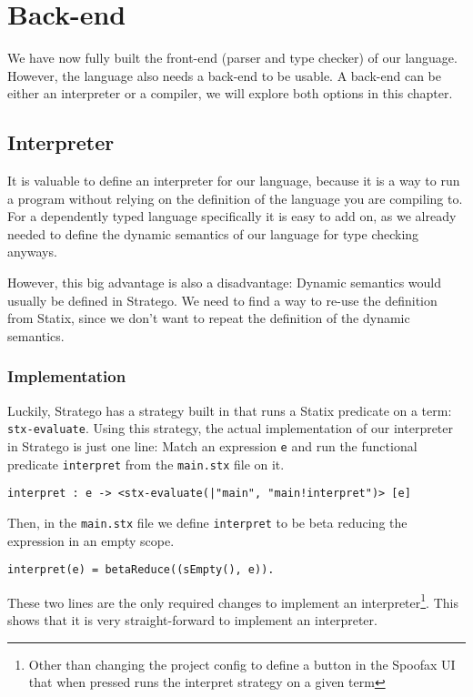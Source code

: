 \chapter{Back-end}
\label{ch:backend}

We have now fully built the front-end (parser and type checker) of our language. However, the language also needs a back-end to be usable. A back-end can be either an interpreter or a compiler, we will explore both options in this chapter.

\section{Interpreter}
It is valuable to define an interpreter for our language, because it is a way to run a program without relying on the definition of the language you are compiling to. For a dependently typed language specifically it is easy to add on, as we already needed to define the dynamic semantics of our language for type checking anyways. 

However, this big advantage is also a disadvantage: Dynamic semantics would usually be defined in Stratego. We need to find a way to re-use the definition from Statix, since we don't want to repeat the definition of the dynamic semantics.

\subsection{Implementation}

Luckily, Stratego has a strategy built in that runs a Statix predicate on a term: \verb|stx-evaluate|. Using this strategy, the actual implementation of our interpreter in Stratego is just one line: Match an expression \verb|e| and run the functional predicate \verb|interpret| from the \verb|main.stx| file on it.

\begin{lstlisting}
interpret : e -> <stx-evaluate(|"main", "main!interpret")> [e]
\end{lstlisting}

Then, in the \verb|main.stx| file we define \verb|interpret| to be beta reducing the expression in an empty scope. 

\begin{lstlisting}
interpret(e) = betaReduce((sEmpty(), e)).
\end{lstlisting}

These two lines are the only required changes to implement an interpreter\footnote{Other than changing the project config to define a button in the Spoofax UI that when pressed runs the interpret strategy on a given term}. This shows that it is very straight-forward to implement an interpreter. 

